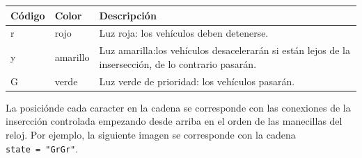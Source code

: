 \begin{longtable}[]{@{}lll@{}}
\toprule
\begin{minipage}[b]{0.09\columnwidth}\raggedright
Código\strut
\end{minipage} & \begin{minipage}[b]{0.10\columnwidth}\raggedright
Color\strut
\end{minipage} & \begin{minipage}[b]{0.72\columnwidth}\raggedright
Descripción\strut
\end{minipage}\tabularnewline
\midrule
\endhead
\begin{minipage}[t]{0.09\columnwidth}\raggedright
r\strut
\end{minipage} & \begin{minipage}[t]{0.10\columnwidth}\raggedright
rojo\strut
\end{minipage} & \begin{minipage}[t]{0.72\columnwidth}\raggedright
Luz roja: los vehículos deben detenerse.\strut
\end{minipage}\tabularnewline
\begin{minipage}[t]{0.09\columnwidth}\raggedright
y\strut
\end{minipage} & \begin{minipage}[t]{0.10\columnwidth}\raggedright
amarillo\strut
\end{minipage} & \begin{minipage}[t]{0.72\columnwidth}\raggedright
Luz amarilla:los vehículos desacelerarán si están lejos de la
insersección, de lo contrario pasarán.\strut
\end{minipage}\tabularnewline
\begin{minipage}[t]{0.09\columnwidth}\raggedright
G\strut
\end{minipage} & \begin{minipage}[t]{0.10\columnwidth}\raggedright
verde\strut
\end{minipage} & \begin{minipage}[t]{0.72\columnwidth}\raggedright
Luz verde de prioridad: los vehículos pasarán.\strut
\end{minipage}\tabularnewline
\bottomrule
\end{longtable}

La posiciónde cada caracter en la cadena se corresponde con las
conexiones de la insercción controlada empezando desde arriba en el
orden de las manecillas del reloj. Por ejemplo, la siguiente imagen se
corresponde con la cadena \texttt{state\ =\ "GrGr"}.

